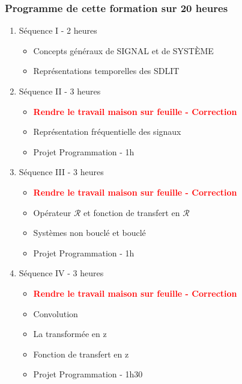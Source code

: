 \documentclass[a4paper,11pt]{beamer}
\begin{document}
\begin{frame}[plain]
\frametitle{Programme de cette formation sur 20 heures}
\begin{enumerate}
  \item Séquence I - 2 heures
  \begin{itemize}
    \item Concepts généraux de SIGNAL et de SYSTÈME
    \item Représentations temporelles des SDLIT
  \end{itemize}
  \item Séquence II - 3 heures
  \begin{itemize}
    \item \textcolor{red}{\textbf{Rendre le travail maison sur feuille -
    Correction}}
    \item Représentation fréquentielle des signaux
    \item Projet Programmation - 1h
  \end{itemize}
  \item Séquence III - 3 heures
  \begin{itemize}
    \item \textcolor{red}{\textbf{Rendre le travail maison sur feuille -
    Correction}}
    \item Opérateur $\mathcal{R}$ et fonction de transfert en $\mathcal{R}$
    \item Systèmes non bouclé et bouclé
    \item Projet Programmation - 1h
  \end{itemize}
  \item Séquence IV - 3 heures
  \begin{itemize}
    \item \textcolor{red}{\textbf{Rendre le travail maison sur feuille -
    Correction}}
    \item Convolution
    \item La transformée en z
    \item Fonction de transfert en z
    \item Projet Programmation - 1h30 
  \end{itemize}
\end{enumerate}
\end{frame}
\end{document}

